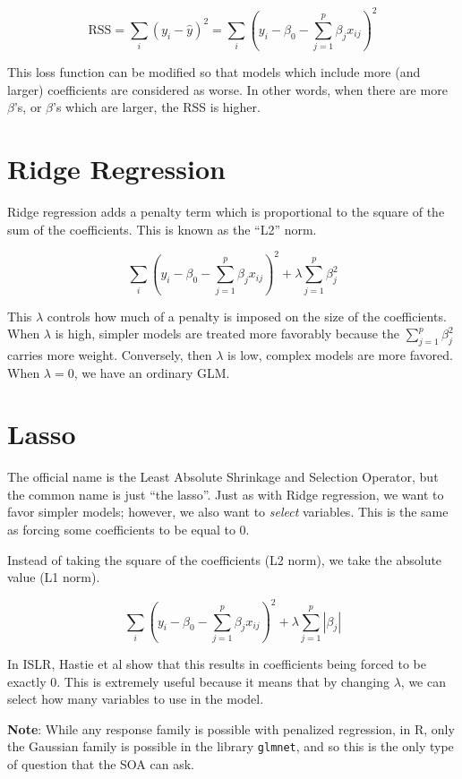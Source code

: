 \documentclass[openany]{book}
\begin{document}
\[
\text{RSS} = \sum_i(y_i - \hat{y})^2 = \sum_i(y_i - \beta_0 - \sum_{j = 1}^p\beta_j x_{ij})^2
\]

This loss function can be modified so that models which include more (and larger) coefficients are considered as worse. In other words, when there are more \(\beta\)'s, or \(\beta\)'s which are larger, the RSS is higher.

\hypertarget{ridge-regression}{%
\section{Ridge Regression}\label{ridge-regression}}

Ridge regression adds a penalty term which is proportional to the square of the sum of the coefficients. This is known as the ``L2'' norm.

\[
\sum_i(y_i - \beta_0 - \sum_{j = 1}^p\beta_j x_{ij})^2 + \lambda \sum_{j = 1}^p\beta_j^2
\]

This \(\lambda\) controls how much of a penalty is imposed on the size of the coefficients. When \(\lambda\) is high, simpler models are treated more favorably because the \(\sum_{j = 1}^p\beta_j^2\) carries more weight. Conversely, then \(\lambda\) is low, complex models are more favored. When \(\lambda = 0\), we have an ordinary GLM.

\hypertarget{lasso}{%
\section{Lasso}\label{lasso}}

The official name is the Least Absolute Shrinkage and Selection Operator, but the common name is just ``the lasso''. Just as with Ridge regression, we want to favor simpler models; however, we also want to \emph{select} variables. This is the same as forcing some coefficients to be equal to 0.

Instead of taking the square of the coefficients (L2 norm), we take the absolute value (L1 norm).

\[
\sum_i(y_i - \beta_0 - \sum_{j = 1}^p\beta_j x_{ij})^2 + \lambda \sum_{j = 1}^p|\beta_j|
\]

In ISLR, Hastie et al show that this results in coefficients being forced to be exactly 0. This is extremely useful because it means that by changing \(\lambda\), we can select how many variables to use in the model.

\textbf{Note}: While any response family is possible with penalized regression, in R, only the Gaussian family is possible in the library \texttt{glmnet}, and so this is the only type of question that the SOA can ask.
\end{document}

